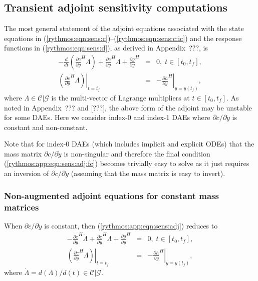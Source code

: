 \documentclass[pdf,ps2pdf,11pt]{SANDreport}
\begin{document}
\subsection{Transient adjoint sensitivity computations}

The most general statement of the adjoint equations associated with the state
equations in (\ref{rythmos:eqn:sens:c})--(\ref{rythmos:eqn:sens:c:ic}) and the
response functions in (\ref{rythmos:eqn:sens:d}), as derived in Appendix~???,
is
%
\begin{eqnarray}
- \frac{d}{dt}\left( \frac{\partial c}{\partial \dot{y}}^H \Lambda \right)
+  \frac{\partial c}{\partial y}^H \Lambda + \frac{\partial g}{\partial y}^H
& = & 0, \; t \in \left[ t_0, t_f \right],
\label{rythmos:app:eqn:sens:adj} \\
\left.\left( \frac{\partial c}{\partial \dot{y}}^H \Lambda \right)\right|_{t=t_f}
& = & - \left. \frac{\partial h}{\partial y}^H \right|_{y=y(t_f)},
\label{rythmos:app:eqn:sens:adj:fc}
\end{eqnarray}
%
where $\Lambda\in\mathcal{C}|\mathcal{G}$ is the multi-vector of Lagrange
multipliers at $t\in[t_0,t_f]$.  As noted in Appendix~??? and [???], the above
form of the adjoint may be unstable for some DAEs.  Here we consider index-0
and index-1 DAEs where $\partial c / {}\partial {}\dot{y}$ is constant and
non-constant.

Note that for index-0 DAEs (which includes implicit and explicit ODEs) that
the mass matrix $\partial c / {}\partial {}\dot{y}$ is non-singular and
therefore the final condition (\ref{rythmos:app:eqn:sens:adj:fc}) becomes
trivially easy to solve as it just requires an inversion of $\partial c /
{}\partial {}\dot{y}$ (assuming that the mass matrix is easy to invert).

\subsubsection{Non-augmented adjoint equations for constant mass matrices}

When $\partial c / {}\partial {}\dot{y}$ is constant, then
(\ref{rythmos:app:eqn:sens:adj}) reduces to
%
\begin{eqnarray}
- \frac{\partial c}{\partial \dot{y}}^H \dot{\Lambda}
+  \frac{\partial c}{\partial y}^H \Lambda + \frac{\partial g}{\partial y}^H
& = & 0, \; t \in \left[ t_0, t_f \right],
\label{rythmos:app:eqn:sens:adj} \\
\left.\left( \frac{\partial c}{\partial \dot{y}}^H \Lambda \right)\right|_{t=t_f}
& = & - \left. \frac{\partial h}{\partial y}^H \right|_{y=y(t_f)},
\label{rythmos:app:eqn:sens:adj:fc}
\end{eqnarray}
%
where $\dot{\Lambda}=d(\Lambda)/d(t)\in\mathcal{C}|\mathcal{G}$.
\end{document}
